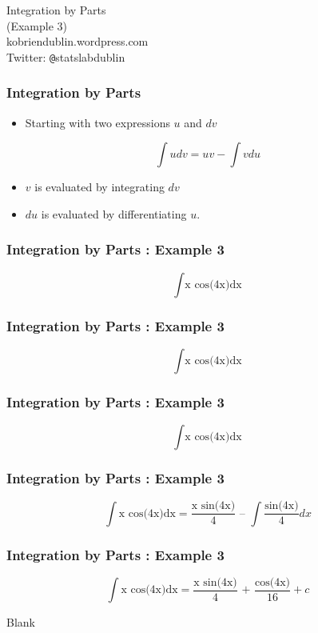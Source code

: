 \documentclass{beamer}
\begin{document}
\begin{frame}
\begin{center}
\Huge
Integration by Parts\\
\LARGE
(Example 3)\\
\bigskip
kobriendublin.wordpress.com\\
Twitter: \texttt{@}statslabdublin


\end{center}
\end{frame}

\begin{frame}
\frametitle{Integration by Parts}
\LARGE
\begin{itemize}
\item Starting with two expressions $u$ and $dv$
\end{itemize}

\[\int u dv = uv - \int vdu \]
\begin{itemize}
\item $v$ is evaluated by integrating $dv$
\item $du$ is evaluated by differentiating $u$.
\end{itemize}
\end{frame}


\begin{frame}
\frametitle{Integration by Parts :  Example 3}
\Huge
\vspace{-3cm}
\[\int \mbox{x cos(4x)} \mbox{dx}\]

 
\end{frame}
\begin{frame}
\frametitle{Integration by Parts :  Example 3}
\Huge
\vspace{-3cm}
\[\int \mbox{x cos(4x)} \mbox{dx}\]

 

\end{frame}
\begin{frame}
\frametitle{Integration by Parts :  Example 3}
\Huge
\vspace{-3cm}
\[\int \mbox{x cos(4x)} \mbox{dx}\]

 

\end{frame}
\begin{frame}
\frametitle{Integration by Parts :  Example 3}
\LARGE
\vspace{-3cm}
\[\int \mbox{x cos(4x)} \mbox{dx} = \frac{\mbox{x sin(4x)}}{4}\mbox{ -- } \int \frac{ \mbox{sin(4x)}}{4}dx \]

 
\end{frame}
\begin{frame}
\frametitle{Integration by Parts :  Example 3}
\LARGE
\vspace{-3cm}
\[\int \mbox{x cos(4x)} \mbox{dx} = \frac{\mbox{x sin(4x)}}{4}\mbox{ + }  \frac{ \mbox{cos(4x)}}{16} + c\]

 
\end{frame}
\begin{frame}
Blank
\end{frame}
\end{document}
